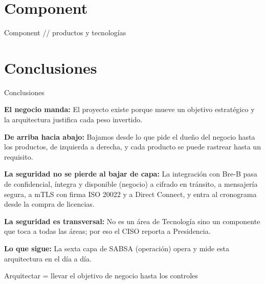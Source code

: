 \documentclass[aspectratio=169,10pt]{beamer}
\begin{document}
\section{Component}
\begin{frame}{Component \textmd{// productos y tecnologías}}
  \vskip4pt
  
\end{frame}

\section{Conclusiones}
\begin{frame}{Conclusiones}
  \begin{cellitems}\small
    \item \textbf{El negocio manda:} El proyecto existe porque mueve un objetivo
      estratégico y la arquitectura justifica cada peso invertido.
    \vskip4pt
    \item \textbf{De arriba hacia abajo:} Bajamos desde lo que pide el
      dueño del negocio hasta los productos, de izquierda a derecha, y cada
      producto se puede rastrear hasta un requisito.
    \vskip4pt
    \item \textbf{La seguridad no se pierde al bajar de capa:} La integración con
      Bre-B pasa de confidencial, íntegra y disponible (negocio) a cifrado en tránsito, a mensajería segura,
      a mTLS con firma ISO 20022 y a Direct Connect, y entra al cronograma
      desde la compra de licencias.
    \vskip4pt
    \item \textbf{La seguridad es transversal:} No es un área de Tecnología sino
      un componente que toca a todas las áreas; por eso el CISO reporta a
      Presidencia.
    \vskip4pt
    \item \textbf{Lo que sigue:} La sexta capa de SABSA (operación) opera y mide
      esta arquitectura en el día a día.
  \end{cellitems}
  \vskip8pt
  \begin{ibox}Arquitectar = llevar el objetivo de negocio hasta los controles\end{ibox}
\end{frame}

\end{document}
